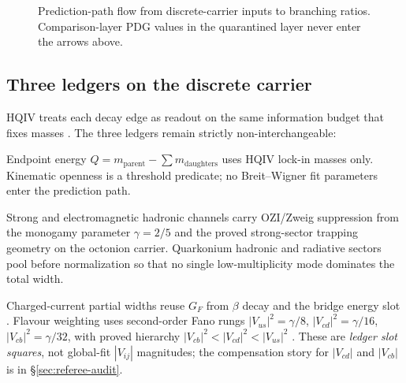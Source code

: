 \documentclass[11pt]{amsart}
\begin{document}
\begin{figure}[ht]
\centering
{}
\caption{Prediction-path flow from discrete-carrier inputs to branching ratios.
Comparison-layer PDG values in the quarantined layer never enter the arrows above.}
\label{fig:hqiv-roadmap}
\end{figure}

\subsection{Three ledgers on the discrete carrier}

HQIV treats each decay edge as readout on the same information budget that fixes
masses \cite{hqiv-tuft-sm-lagrangian-paper}.
The three ledgers remain strictly non-interchangeable:

\begin{description}[
  font=\normalfont\bfseries,
  leftmargin=1.5em,
  itemsep=0.35\baselineskip,
  parsep=0.05\baselineskip,
  style=nextline
]
  \item[Ledger I --- mass and $Q$.]
  Endpoint energy $Q=m_{\mathrm{parent}}-\sum m_{\mathrm{daughters}}$ uses
  HQIV lock-in masses only.
  Kinematic openness is a threshold predicate; no Breit--Wigner fit parameters
  enter the prediction path.
  \item[Ledger II --- curvature overlap.]
  Strong and electromagnetic hadronic channels carry OZI/Zweig suppression
  \cite{zweig1964,lipkin1976,hqiv-gluon-curvature-note} from the monogamy parameter
  $\gamma=2/5$ and the proved strong-sector trapping geometry on the octonion
  carrier.
  Quarkonium hadronic and radiative sectors pool before normalization so that
  no single low-multiplicity mode dominates the total width.
  \item[Ledger III --- weak width.]
  Charged-current partial widths reuse $G_F$ from $\beta$ decay and the bridge
  energy slot \cite{hqiv-nucleon-binding-paper}.
  Flavour weighting uses second-order Fano rungs $|V_{us}|^2=\gamma/8$,
  $|V_{cd}|^2=\gamma/16$, $|V_{cb}|^2=\gamma/32$, with proved hierarchy
  $|V_{cb}|^2<|V_{cd}|^2<|V_{us}|^2$ \cite{cabibbo1963,kobayashi1973,pdg2024}.
  These are \emph{ledger slot squares}, not global-fit $|V_{ij}|$ magnitudes;
  the compensation story for $|V_{cd}|$ and $|V_{cb}|$ is in \S\ref{sec:referee-audit}.
\end{description}
\end{document}
